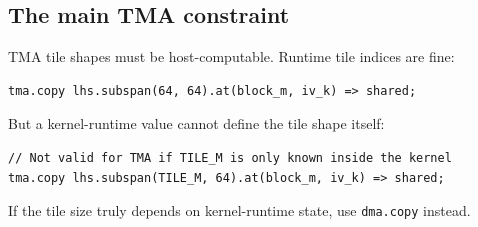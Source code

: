 \subsection*{The main TMA constraint}

TMA tile shapes must be host-computable. Runtime tile indices are fine:

\begin{lstlisting}[language=croqtile,caption={A host-computable tile shape}]
tma.copy lhs.subspan(64, 64).at(block_m, iv_k) => shared;
\end{lstlisting}

But a kernel-runtime value cannot define the tile shape itself:

\begin{lstlisting}[language=croqtile,caption={A runtime tile index that is rejected}]
// Not valid for TMA if TILE_M is only known inside the kernel
tma.copy lhs.subspan(TILE_M, 64).at(block_m, iv_k) => shared;
\end{lstlisting}

If the tile size truly depends on kernel-runtime state, use \texttt{dma.copy} instead.
